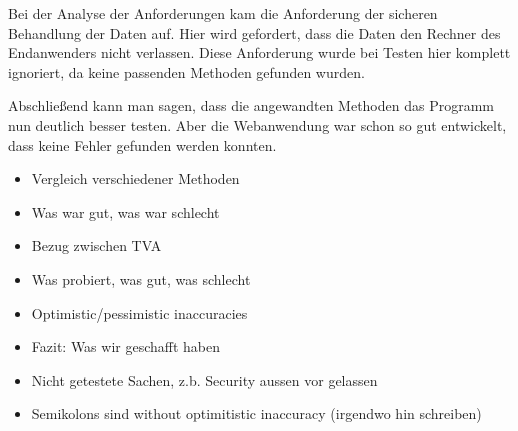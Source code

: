 \documentclass[ngerman]{article}
\begin{document}
Bei der Analyse der Anforderungen kam die Anforderung der sicheren Behandlung der Daten auf. Hier wird gefordert, dass die Daten den Rechner des Endanwenders nicht verlassen. Diese Anforderung wurde bei Testen hier komplett ignoriert, da keine passenden Methoden gefunden wurden.

Abschließend kann man sagen, dass die angewandten Methoden das Programm nun deutlich besser testen.
Aber die Webanwendung war schon so gut entwickelt, dass keine Fehler gefunden werden konnten.

\begin{itemize}
    \item Vergleich verschiedener Methoden
    \item Was war gut, was war schlecht
    \item Bezug zwischen TVA
    \item Was probiert, was gut, was schlecht
    \item Optimistic/pessimistic inaccuracies
    \item Fazit: Was wir geschafft haben
    \item Nicht getestete Sachen, z.b. Security aussen vor gelassen
    \item Semikolons sind without optimitistic inaccuracy (irgendwo hin schreiben)
\end{itemize}
\end{document}
